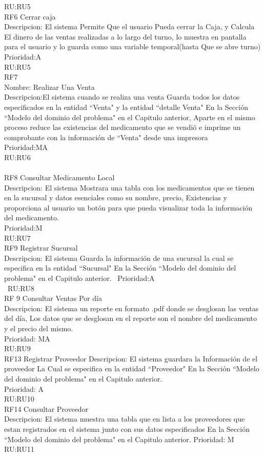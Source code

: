 RU:RU5
\\
RF6 Cerrar caja\\
Descripcion: El sistema Permite Que el usuario Pueda cerrar la Caja, y Calcula El dinero de las ventas realizadas a lo largo del turno, lo muestra en pantalla para el usuario y lo guarda como una variable temporal(hasta Que se abre turno)\\
Prioridad:A\\
RU:RU5
\\
RF7\\
Nombre: Realizar Una Venta\\
Descripcion:El sistema cuando se realiza una venta Guarda todos los datos especificados en la entidad ``Venta" y la entidad ``detalle Venta" En la Sección ``Modelo del dominio del problema" en el  Capitulo anterior, Aparte en el mismo proceso reduce las existencias del medicamento que se vendió e imprime un comprobante con la información de ``Venta" desde una impresora\\
Prioridad:MA\\
RU:RU6\\
\\
RF8 Consultar Medicamento Local\\
Descripcion: El sistema Mostrara una tabla con los medicamentos que se tienen en la sucursal y datos esenciales como su nombre, precio, Existencias y proporciona al usuario un botón para que pueda visualizar toda la información del medicamento.\\
Prioridad:M\\
RU:RU7
\\
RF9 Registrar Sucursal\\
Descripcion: El sistema Guarda la información de una sucursal la cual se especifica en la entidad ``Sucursal" En la Sección ``Modelo del dominio del problema" en el  Capitulo anterior. \
Prioridad:A\\\
RU:RU8
\\
RF 9 Consultar Ventas Por día\\
Descripcion: El sistema un reporte en formato .pdf donde se desglosan las ventas del día, Los datos que se desglosan en el reporte son el nombre del medicamento y el precio del mismo.\\
Prioridad: MA\\
RU:RU9
\\
RF13 Registrar Proveedor
Descripcion: El sistema guardara la Información de el proveedor La Cual se especifica en la entidad ``Proveedor" En la Sección ``Modelo del dominio del problema" en el  Capitulo anterior.\\
Prioridad: A\\
RU:RU10
\\
RF14 Consultar Proveedor\\
Descripcion: El sistema muestra una tabla que en lista a los proveedores que estan registrados en el sistema junto con sus datos especificados En la Sección ``Modelo del dominio del problema" en el  Capitulo anterior.
Prioridad: M\\
RU:RU11
\newpage


